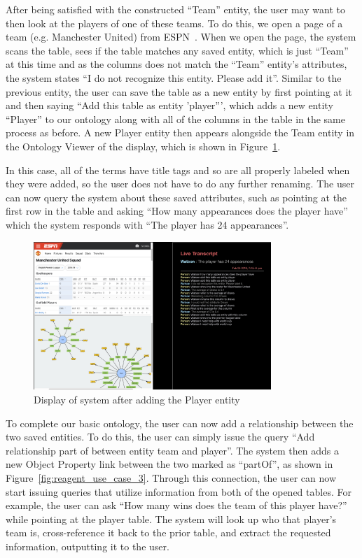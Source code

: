 After being satisfied with the constructed ``Team'' entity, the user may want
to then look at the players of one of these teams. To
do this, we open a page of a team (e.g. Manchester United) from ESPN~\cite{espn_squad_table}. When we open
the page, the system scans the table, sees if the table matches
any saved entity, which is just ``Team'' at this time and as the columns does not match the ``Team'' entity's attributes,
the system states ``I do not recognize this entity. Please add it''. Similar
to the previous entity, the user
can save the table as a new entity by first pointing at it and then saying ``Add this table as entity 'player''', which
adds a new entity ``Player'' to our ontology along with all of the columns in the
table in the same process as before. A new Player entity then appears
alongside the Team entity in the Ontology Viewer of the display, which
is shown in Figure~\ref{fig:reagent_use_case_2}.

In this case, all of the terms have title tags and so are all properly labeled when they were added, so the user does not have to do any further renaming. The user can
now query the system about these saved attributes, such as pointing at the first
row in the table and asking ``How many appearances does the player have'' which
the system responds with ``The player has 24 appearances''.

\begin{figure}[hbtp]
\centering
\includegraphics[width=0.8\textwidth]{chapters/03_reagent/figures/use_case_2.png}
\caption{Display of system after adding the Player entity}
\label{fig:reagent_use_case_2}
\end{figure}

To complete our basic ontology, the user can now add a relationship
between the two saved entities. To do this, the user can simply issue
the query ``Add relationship part of between entity team and player''. The
system then adds a new Object Property link between the two marked as 
``partOf'', as shown in Figure~\ref{fig:reagent_use_case_3}. Through this connection,
the user can now start issuing queries that utilize information from both of the opened tables. For example,
the user can ask ``How many wins does the team of this player have?'' while pointing
at the player table. The system will look up who that player's team is, cross-reference it
back to the prior table, and extract the requested information, outputting it to the user.

